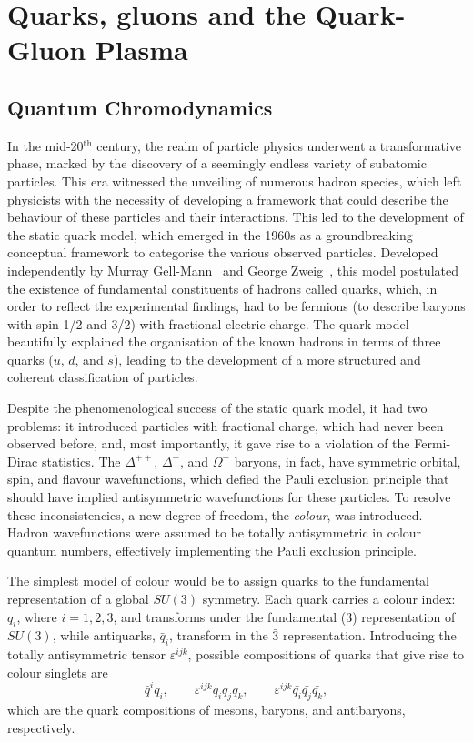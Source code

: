 \chapter{Quarks, gluons and the Quark-Gluon Plasma}\label{ch:QGP}
\section{Quantum Chromodynamics}
In the mid-20$^{\mathrm{th}}$ century, the realm of particle physics underwent a transformative phase, marked by the discovery of a seemingly endless variety of subatomic particles. This era witnessed the unveiling of numerous hadron species, which left physicists with the necessity of developing a framework that could describe the behaviour of these particles and their interactions. This led to the development of the static quark model, which emerged in the 1960s as a groundbreaking conceptual framework to categorise the various observed particles. Developed independently by Murray Gell-Mann~\cite{Gell-Mann:1964ewy} and George Zweig~\cite{Zweig:1964jf, Fritzsch:1972jv}, this model postulated the existence of fundamental constituents of hadrons called quarks, which, in order to reflect the experimental findings, had to be fermions (to describe baryons with spin 1/2 and 3/2) with fractional electric charge. The quark model beautifully explained the organisation of the known hadrons in terms of three quarks ($u$, $d$, and $s$), leading to the development of a more structured and coherent classification of particles.

Despite the phenomenological success of the static quark model, it had two problems: it introduced particles with fractional charge, which had never been observed before, and, most importantly, it gave rise to a violation of the Fermi-Dirac statistics. The $\Delta^{++}$, $\Delta^{-}$, and $\Omega^{-}$ baryons, in fact, have symmetric orbital, spin, and flavour wavefunctions, which defied the Pauli exclusion principle that should have implied antisymmetric wavefunctions for these particles. To resolve these inconsistencies, a new degree of freedom, the \emph{colour}, was introduced. Hadron wavefunctions were assumed to be totally antisymmetric in colour quantum numbers, effectively implementing the Pauli exclusion principle.

The simplest model of colour would be to assign quarks to the fundamental representation of a global $SU(3)$ symmetry. Each quark carries a colour index: $q_i$, where $i = 1, 2, 3$, and transforms under the fundamental ($3$) representation of $SU(3)$, while antiquarks,  $\bar{q}_i$, transform in the $\bar{3}$ representation. Introducing the totally antisymmetric tensor $\varepsilon^{ijk}$, possible compositions of quarks that give rise to colour singlets are 
\begin{equation*}
    \bar{q}^iq_i,\qquad \varepsilon^{ijk}q_iq_jq_k,\qquad \varepsilon^{ijk}\bar{q_i}\bar{q_j}\bar{q_k},
\end{equation*}
which are the quark compositions of mesons, baryons, and antibaryons, respectively. 

